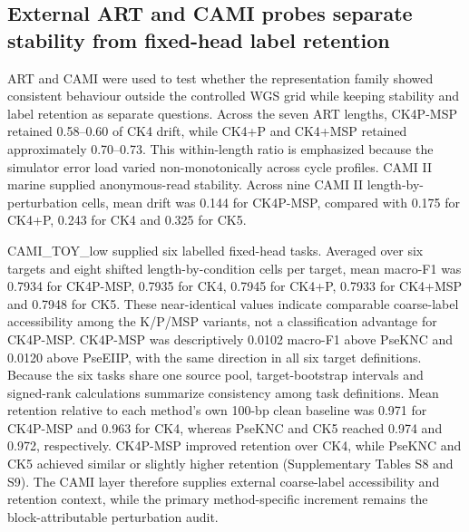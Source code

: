 \begin{table}[!tbp]
\centering
\scriptsize
\caption{Compact main-method metrics. Paired cosine and L2 drift are means across 24 controlled WGS length-by-perturbation cells. Logistic macro-F1 is averaged across 132 fixed-split WGS readout cells and quantifies feature accessibility to a shallow probe. Feature count reports the fixed representation dimension.}
\label{tab:table3}

\end{table}


\subsection{External ART and CAMI probes separate stability from fixed-head label retention}

ART and CAMI were used to test whether the representation family showed consistent behaviour outside the controlled WGS grid while keeping stability and label retention as separate questions. Across the seven ART lengths, CK4P-MSP retained 0.58--0.60 of CK4 drift, while CK4+P and CK4+MSP retained approximately 0.70--0.73. This within-length ratio is emphasized because the simulator error load varied non-monotonically across cycle profiles. CAMI II marine supplied anonymous-read stability. Across nine CAMI II length-by-perturbation cells, mean drift was 0.144 for CK4P-MSP, compared with 0.175 for CK4+P, 0.243 for CK4 and 0.325 for CK5.

CAMI\_TOY\_low supplied six labelled fixed-head tasks. Averaged over six targets and eight shifted length-by-condition cells per target, mean macro-F1 was 0.7934 for CK4P-MSP, 0.7935 for CK4, 0.7945 for CK4+P, 0.7933 for CK4+MSP and 0.7948 for CK5. These near-identical values indicate comparable coarse-label accessibility among the K/P/MSP variants, not a classification advantage for CK4P-MSP. CK4P-MSP was descriptively 0.0102 macro-F1 above PseKNC and 0.0120 above PseEIIP, with the same direction in all six target definitions. Because the six tasks share one source pool, target-bootstrap intervals and signed-rank calculations summarize consistency among task definitions. Mean retention relative to each method's own 100-bp clean baseline was 0.971 for CK4P-MSP and 0.963 for CK4, whereas PseKNC and CK5 reached 0.974 and 0.972, respectively. CK4P-MSP improved retention over CK4, while PseKNC and CK5 achieved similar or slightly higher retention (Supplementary Tables S8 and S9). The CAMI layer therefore supplies external coarse-label accessibility and retention context, while the primary method-specific increment remains the block-attributable perturbation audit.

